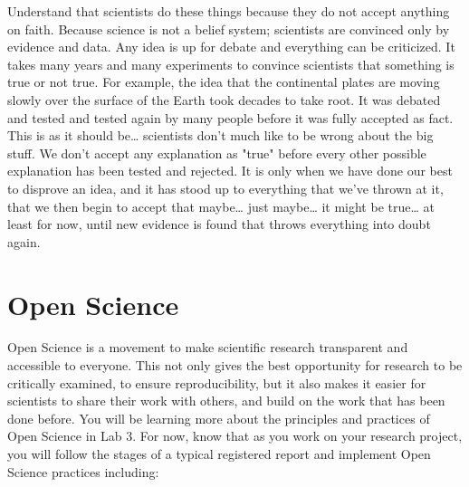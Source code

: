 \documentclass[
]{book}
\begin{document}
Understand that scientists do these things because they do not accept anything on faith. Because science is not a belief system; scientists are convinced only by evidence and data. Any idea is up for debate and everything can be criticized. It takes many years and many experiments to convince scientists that something is true or not true. For example, the idea that the continental plates are moving slowly over the surface of the Earth took decades to take root. It was debated and tested and tested again by many people before it was fully accepted as fact. This is as it should be\ldots{} scientists don't much like to be wrong about the big stuff. We don't accept any explanation as "true" before every other possible explanation has been tested and rejected. It is only when we have done our best to disprove an idea, and it has stood up to everything that we've thrown at it, that we then begin to accept that maybe\ldots{} just maybe\ldots{} it might be true\ldots{} at least for now, until new evidence is found that throws everything into doubt again.

\hypertarget{open-science}{%
\chapter*{Open Science}\label{open-science}}

Open Science is a movement to make scientific research transparent and accessible to everyone. This not only gives the best opportunity for research to be critically examined, to ensure reproducibility, but it also makes it easier for scientists to share their work with others, and build on the work that has been done before. You will be learning more about the principles and practices of Open Science in Lab 3. For now, know that as you work on your research project, you will follow the stages of a typical registered report and implement Open Science practices including:
\end{document}
